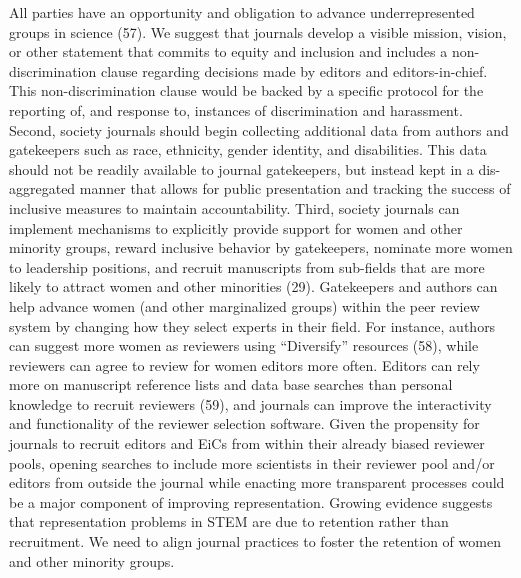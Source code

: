 \documentclass[11pt,]{article}
\begin{document}
All parties have an opportunity and obligation to advance
underrepresented groups in science (57). We suggest that journals
develop a visible mission, vision, or other statement that commits to
equity and inclusion and includes a non-discrimination clause regarding
decisions made by editors and editors-in-chief. This non-discrimination
clause would be backed by a specific protocol for the reporting of, and
response to, instances of discrimination and harassment. Second, society
journals should begin collecting additional data from authors and
gatekeepers such as race, ethnicity, gender identity, and disabilities.
This data should not be readily available to journal gatekeepers, but
instead kept in a dis-aggregated manner that allows for public
presentation and tracking the success of inclusive measures to maintain
accountability. Third, society journals can implement mechanisms to
explicitly provide support for women and other minority groups, reward
inclusive behavior by gatekeepers, nominate more women to leadership
positions, and recruit manuscripts from sub-fields that are more likely
to attract women and other minorities (29). Gatekeepers and authors can
help advance women (and other marginalized groups) within the peer
review system by changing how they select experts in their field. For
instance, authors can suggest more women as reviewers using
``Diversify'' resources (58), while reviewers can agree to review for
women editors more often. Editors can rely more on manuscript reference
lists and data base searches than personal knowledge to recruit
reviewers (59), and journals can improve the interactivity and
functionality of the reviewer selection software. Given the propensity
for journals to recruit editors and EiCs from within their already
biased reviewer pools, opening searches to include more scientists in
their reviewer pool and/or editors from outside the journal while
enacting more transparent processes could be a major component of
improving representation. Growing evidence suggests that representation
problems in STEM are due to retention rather than recruitment. We need
to align journal practices to foster the retention of women and other
minority groups.
\end{document}
